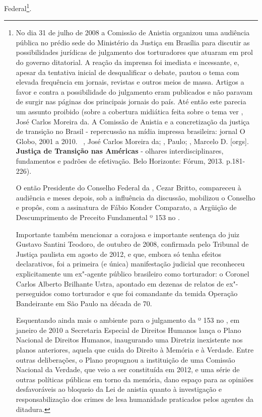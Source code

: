 Federal\footnote{No dia 31 de julho de 2008 a Comissão de Anistia
  organizou uma audiência pública no prédio sede do Ministério da
  Justiça em Brasília para discutir as possibilidades jurídicas de
  julgamento dos torturadores que atuaram em prol do governo ditatorial.
  A reação da imprensa foi imediata e incessante, e, apesar da tentativa
  inicial de desqualificar o debate, pautou o tema com elevada
  frequência em jornais, revistas e outros meios de massa. Artigos a
  favor e contra a possibilidade do julgamento eram publicados e não
  paravam de surgir nas páginas dos principais jornais do país. Até
  então este parecia um assunto proibido (sobre a cobertura midiática
  feita sobre o tema ver  , José Carlos Moreira da. A Comissão
  de Anistia e a concretização da justiça de transição no Brasil -
  repercussão na mídia impressa brasileira: jornal O Globo, 2001 a
  2010.~ , José Carlos Moreira da; , Paulo; ,
  Marcelo D. {[}orgs{]}. \textbf{Justiça de Transição nas Américas} -
  olhares interdisciplinares, fundamentos e padrões de efetivação. Belo
  Horizonte: Fórum, 2013. p.181-226).

  O então Presidente do Conselho Federal da , Cezar Britto,
  compareceu à audiência e meses depois, sob a influência da discussão,
  mobilizou o Conselho e propôs, com a assinatura de Fábio Konder
  Comparato, a Argüição de Descumprimento de Preceito Fundamental º 153
  no .

  Importante também mencionar a corajosa e importante sentença do juiz
  Gustavo Santini Teodoro, de outubro de 2008, confirmada pelo Tribunal
  de Justiça paulista em agosto de 2012, e que, embora só tenha efeitos
  declarativos, foi a primeira (e única) manifestação judicial que
  reconheceu explicitamente um ex"-agente público brasileiro como
  torturador: o Coronel Carlos Alberto Brilhante Ustra, apontado em
  dezenas de relatos de ex"-perseguidos como torturador e que foi
  comandante da temida Operação Bandeirante em São Paulo na década de
  70.

  Esquentando ainda mais o ambiente para o julgamento da  º 153 no
  , em janeiro de 2010 a Secretaria Especial de Direitos Humanos
  lança o  Plano Nacional de Direitos Humanos, inaugurando uma
  Diretriz inexistente nos planos anteriores, aquela que cuida do
  Direito à Memória e à Verdade. Entre outras deliberações, o Plano
  propugnou a instituição de uma Comissão Nacional da Verdade, que veio
  a ser constituída em 2012, e uma série de outras políticas públicas em
  torno da memória, dano espaço para as opiniões desfavoráveis ao
  bloqueio da Lei de anistia quanto à investigação e responsabilização
  dos crimes de lesa humanidade praticados pelos agentes da ditadura.}.

